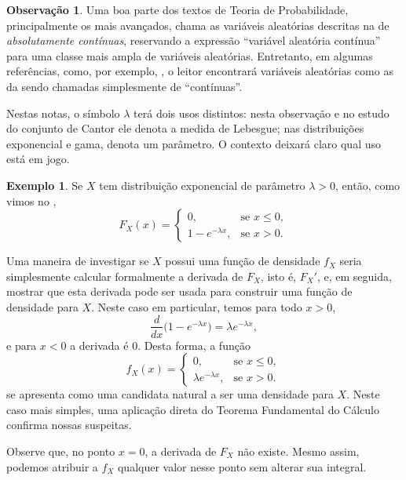 \documentclass[12pt,portuguese]{article}
\theoremstyle{definition}
\newtheorem{example}[example]{Exemplo}
\newtheorem{remark}[remark]{Observação}
\theoremstyle{plainexercise}
\theoremstyle{starredexercise}
\theoremstyle{definition}
\begin{document}
\begin{remark}
  Uma boa parte dos textos de Teoria de Probabilidade, principalmente os mais avançados,
  chama as variáveis aleatórias descritas na
   de \emph{absolutamente contínuas}, reservando a
  expressão ``variável aleatória contínua'' para uma classe mais ampla de variáveis aleatórias.
  Entretanto, em algumas referências, como, por exemplo, \cite{GrimmettWelsh2014},
  o leitor encontrará variáveis aleatórias como as da 
  sendo chamadas simplesmente de ``contínuas''.

  Nestas notas, o símbolo $\lambda$ terá dois usos distintos: nesta observação e
  no estudo do conjunto de Cantor ele denota a medida de Lebesgue; nas
  distribuições exponencial e gama, denota um parâmetro. O contexto deixará
  claro qual uso está em jogo.
\end{remark}

\begin{example}\label{ex:densidade-exponencial}
  Se $X$ tem distribuição exponencial de parâmetro $\lambda > 0$, então,
  como vimos no ,
  \[
    F_X(x) =
    \begin{cases}
      0, & \text{se } x \leqslant 0, \\[0.2cm]
      1 - e^{-\lambda x}, & \text{se } x > 0.
    \end{cases}
  \]

  Uma maneira de investigar se $X$ possui uma função de densidade $f_{X}$ seria
  simplesmente calcular formalmente a derivada de $F_X$, isto é,
  $F_{X}'$, e, em seguida, mostrar que esta derivada pode ser usada para construir
  uma função de densidade para $X$.
  Neste caso em particular, temos para todo $x > 0$,
  \[
    \frac{d}{dx}\bigl(1 - e^{-\lambda x}\bigr) = \lambda e^{-\lambda x},
  \]
  e para $x < 0$ a derivada é $0$. Desta forma, a função
  \[
    f_X(x) =
    \begin{cases}
      0, & \text{se } x \leqslant 0, \\[0.2cm]
      \lambda e^{-\lambda x}, & \text{se } x > 0.
    \end{cases}
  \]
  se apresenta como uma candidata natural a ser uma densidade para $X$.
  Neste caso mais simples, uma aplicação direta do
  Teorema Fundamental do Cálculo confirma nossas suspeitas.
\end{example}

Observe que, no ponto $x=0$, a derivada de $F_X$ não existe. Mesmo assim,
podemos atribuir a $f_X$ qualquer valor nesse ponto sem alterar sua integral.
\end{document}
